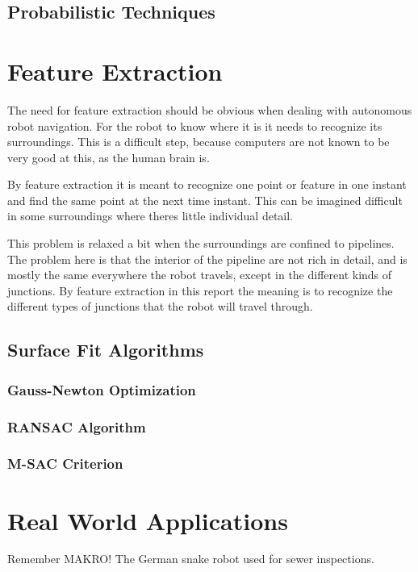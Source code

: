 \subsection{Probabilistic Techniques}



\section{Feature Extraction}
The need for feature extraction should be obvious when dealing with autonomous robot
navigation. For the robot to know where it is it needs to recognize its surroundings. This
is a difficult step, because computers are not known to be very good at this, as the human
brain is. 

By feature extraction it is meant to recognize one point or feature in one instant and
find the same point at the next time instant. This can be imagined difficult in some
surroundings where theres little individual detail. 

This problem is relaxed a bit when the surroundings are confined to pipelines. The problem
here is that the interior of the pipeline are not rich in detail, and is mostly the same
everywhere the robot travels, except in the different kinds of junctions. By feature
extraction in this report the meaning is to recognize the different types of junctions
that the robot will travel through. 

\cite{theilemann-breivik}



\subsection{Surface Fit Algorithms}


\subsubsection{Gauss-Newton Optimization}


\subsubsection{RANSAC Algorithm}


\subsubsection{M-SAC Criterion}



\section{Real World Applications}

Remember MAKRO! The German snake robot used for sewer inspections. 



